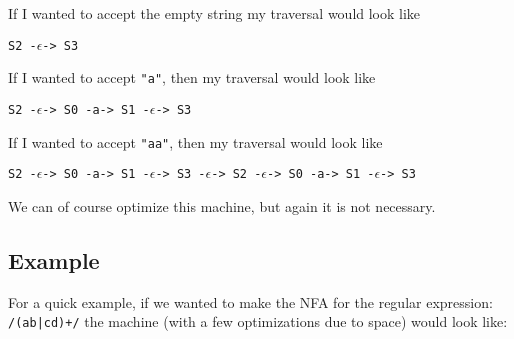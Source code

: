 \documentclass[main.tex]{subfiles}
\begin{document}
If I wanted to accept the empty string my traversal would look like
\begin{center}
    \texttt{S2 -$\epsilon$-> S3}
\end{center}

If I wanted to accept \texttt{"a"}, then my traversal would look like
\begin{center}
    \texttt{S2 -$\epsilon$-> S0 -a-> S1 -$\epsilon$-> S3}
\end{center}

If I wanted to accept \texttt{"aa"}, then my traversal would look like
\begin{center}
    \texttt{S2 -$\epsilon$-> S0 -a-> S1 -$\epsilon$-> S3 -$\epsilon$-> S2 -$\epsilon$-> S0 -a-> S1 -$\epsilon$-> S3}
\end{center}

We can of course optimize this machine, but again it is not necessary. 

\subsection{Example}

For a quick example, if we wanted to make the NFA for the regular expression: \texttt{/(ab|cd)+/} the machine (with a few optimizations due to space) would look like: 
\end{document}
